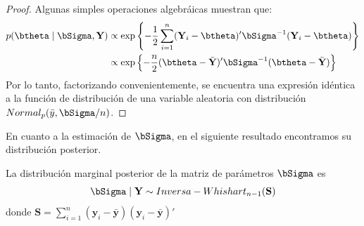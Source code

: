 \documentclass[10pt,openright]{book}\usepackage[]{graphicx}\usepackage[]{color}
\begin{document}
\begin{proof}
Algunas simples operaciones algebr\'aicas muestran que:
\begin{align*}
p(\btheta \mid \bSigma,\mathbf{Y}) &\propto \exp\left\{ -\frac{1}{2}\sum_{i=1}^n (\mathbf{Y}_i-\btheta)'\bSigma^{-1}(\mathbf{Y}_i-\btheta)\right\}\\
&\propto \exp\left\{ -\frac{n}{2}(\btheta-\bar{\mathbf{Y}})'\bSigma^{-1}(\btheta-\bar{\mathbf{Y}})\right\}
\end{align*}
Por lo tanto, factorizando convenientemente, se encuentra una expresi\'on id\'entica a la funci\'on de distribuci\'on de una variable aleatoria con distribuci\'on $Normal_p(\bar{y},\bSigma/n)$.
\end{proof}

En cuanto a la estimaci\'on de $\bSigma$, en el siguiente resultado encontramos su distribuci\'on posterior.
\begin{Res}
La distribuci\'on marginal posterior de la matriz de par\'ametros $\bSigma$ es
\begin{equation*}
\bSigma \mid \mathbf{Y}\sim Inversa-Whishart_{n-1}(\mathbf{S})
\end{equation*}
donde $\mathbf{S}=\sum_{i=1}^n(\mathbf{y}_i-\bar{\mathbf{y}})(\mathbf{y}_i-\bar{\mathbf{y}})'$
\end{Res}
\end{document}
